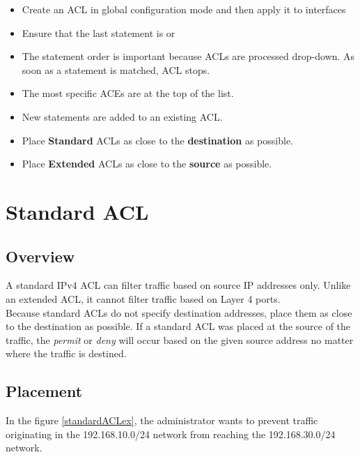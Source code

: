 \begin{itemize}
\item Create an ACL in global configuration mode and then apply it to interfaces
\item Ensure that the last statement is  or 
\item The statement order is important because ACLs are processed drop-down. As soon as a statement is matched, ACL stops.
\item The most specific ACEs are at the top of the list.
\item New statements are added to an existing ACL.
\item Place \textbf{Standard} ACLs as close to the \textbf{destination} as possible.
\item Place \textbf{Extended} ACLs as close to the \textbf{source} as possible.
\end{itemize}
	
\section{Standard ACL}

\subsection{Overview}

A standard IPv4 ACL can filter traffic based on source IP addresses only. Unlike an extended ACL, it cannot filter traffic based on Layer 4 ports.\\
 
Because standard ACLs do not specify destination addresses, place them as close to the destination as possible. If a standard ACL was placed at the source of the traffic, the \textit{permit} or \textit{deny} will occur based on the given source address no matter where the traffic is destined. 

\subsection{Placement}

In the figure \ref{standardACLex}, the administrator wants to prevent traffic originating in the 192.168.10.0/24 network from reaching the 192.168.30.0/24 network.\\

